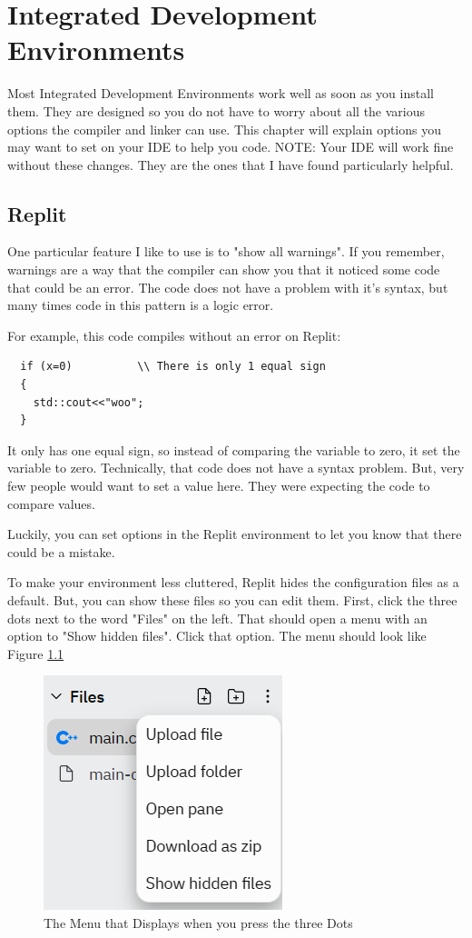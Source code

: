 

\chapter{Integrated Development Environments}
Most Integrated Development Environments work well as soon as you install them. They are designed so you do not have to worry about all the various options the compiler and linker can use. This chapter will explain options you may want to set on your IDE to help you code. NOTE: Your IDE will work fine without these changes. They are the ones that I have found particularly helpful.  
\section{Replit}
\label{showwarning}
One particular feature I like to use is to "show all warnings". If you remember, warnings are a way that the compiler can show you that it noticed some code that could be an error. The code does not have a problem with it's syntax, but many times code in this pattern is a logic error.

For example, this code compiles without an error on Replit:
\begin{lstlisting}
  if (x=0)          \\ There is only 1 equal sign
  {
    std::cout<<"woo";
  }
\end{lstlisting}
It only has one equal sign, so instead of comparing the variable
to zero, it set the variable to zero. Technically, that code does not have a syntax problem. But, very few people would want to set a value here. They were expecting the code to compare values.

Luckily, you can set options in the Replit environment to let you know that there could be a mistake.

To make your environment less cluttered, Replit hides the configuration files as a default. But, you can show these files so you can edit them. First, click the three dots next to the word "Files" on the left. That should open a menu with an option to "Show hidden files". Click that option. The menu should look like Figure \ref{fig:ShowHiddenMenu}

\begin{figure}
    \centering
    \includegraphics{images/showhidden.PNG}
    \caption{The Menu that Displays when you press the three Dots}
    \label{fig:ShowHiddenMenu}
\end{figure}

